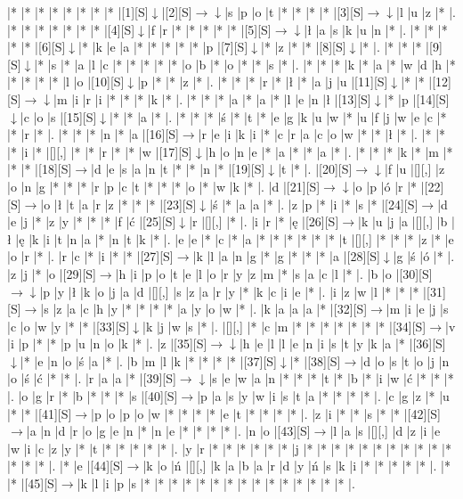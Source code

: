 \documentclass[11pt]{article}
\newcommand\drarr{$\rightarrow \!\!\!\!\! \downarrow$}
\newcommand\rarr{$\rightarrow$}
\newcommand\darr{$\downarrow$}
\begin{document}
\noindent\begin{Puzzle}{22}{31}|*	|*	|*	|*	|*	|*	|*	|*	|[1][S]\darr	|[2][S]\drarr	|s	|p	|o	|t	|*	|*	|*	|*	|[3][S]\drarr	|l	|u	|z	|*	|.
|*	|*	|*	|*	|*	|*	|*	|[4][S]\darr	|f	|r	|*	|*	|*	|*	|*	|[5][S]\drarr	|ł	|a	|s	|k	|u	|n	|*	|.
|*	|*	|*	|*	|*	|[6][S]\darr	|*	|k	|e	|a	|*	|*	|*	|*	|*	|p	|[7][S]\darr	|*	|z	|*	|*	|[8][S]\darr	|*	|.
|*	|*	|*	|[9][S]\darr	|*	|s	|*	|a	|l	|c	|*	|*	|*	|*	|*	|o	|b	|*	|o	|*	|*	|s	|*	|.
|*	|*	|*	|k	|*	|a	|*	|w	|d	|h	|*	|*	|*	|*	|*	|l	|o	|[10][S]\darr	|p	|*	|*	|z	|*	|.
|*	|*	|*	|r	|*	|ł	|*	|a	|j	|u	|[11][S]\darr	|*	|*	|[12][S]\drarr	|m	|i	|r	|i	|*	|*	|*	|k	|*	|.
|*	|*	|*	|a	|*	|a	|*	|l	|e	|n	|ł	|[13][S]\darr	|*	|p	|[14][S]\darr	|c	|o	|s	|[15][S]\darr	|*	|*	|a	|*	|.
|*	|*	|*	|ś	|*	|t	|*	|e	|g	|k	|u	|w	|*	|u	|f	|j	|w	|e	|c	|*	|*	|r	|*	|.
|*	|*	|*	|n	|*	|a	|[16][S]\rarr	|r	|e	|i	|k	|i	|*	|c	|r	|a	|c	|o	|w	|*	|*	|ł	|*	|.
|*	|*	|*	|i	|*	|[][,]{ }	|*	|*	|r	|*	|*	|w	|[17][S]\darr	|h	|o	|n	|e	|*	|a	|*	|*	|a	|*	|.
|*	|*	|*	|k	|*	|m	|*	|*	|*	|[18][S]\rarr	|d	|e	|s	|a	|n	|t	|*	|*	|n	|*	|[19][S]\darr	|t	|*	|.
|[20][S]\drarr	|f	|u	|[][,]{ }	|z	|o	|n	|g	|*	|*	|*	|r	|p	|c	|t	|*	|*	|*	|o	|*	|w	|k	|*	|.
|d	|[21][S]\drarr	|o	|p	|ó	|r	|*	|[22][S]\rarr	|o	|ł	|t	|a	|r	|z	|*	|*	|*	|[23][S]\darr	|ś	|*	|a	|a	|*	|.
|z	|p	|*	|i	|*	|s	|*	|[24][S]\rarr	|d	|e	|j	|*	|z	|y	|*	|*	|*	|f	|ć	|[25][S]\darr	|r	|[][,]{ }	|*	|.
|i	|r	|*	|ę	|[26][S]\rarr	|k	|u	|j	|a	|[][,]{ }	|b	|ł	|ę	|k	|i	|t	|n	|a	|*	|n	|t	|k	|*	|.
|e	|e	|*	|c	|*	|a	|*	|*	|*	|*	|*	|*	|t	|[][,]{ }	|*	|*	|*	|z	|*	|e	|o	|r	|*	|.
|r	|c	|*	|i	|*	|*	|[27][S]\rarr	|k	|l	|a	|n	|g	|*	|g	|*	|*	|*	|a	|[28][S]\darr	|g	|ś	|ó	|*	|.
|z	|j	|*	|o	|[29][S]\rarr	|h	|i	|p	|o	|t	|e	|l	|o	|r	|y	|z	|m	|*	|s	|a	|c	|l	|*	|.
|b	|o	|[30][S]\drarr	|p	|y	|ł	|k	|o	|j	|a	|d	|[][,]{ }	|s	|z	|a	|r	|y	|*	|k	|c	|i	|e	|*	|.
|i	|z	|w	|l	|*	|*	|*	|[31][S]\rarr	|s	|z	|a	|c	|h	|y	|*	|*	|*	|*	|a	|y	|o	|w	|*	|.
|k	|a	|a	|a	|*	|[32][S]\rarr	|m	|i	|e	|j	|s	|c	|o	|w	|y	|*	|*	|[33][S]\darr	|k	|j	|w	|s	|*	|.
|[][,]{ }	|*	|c	|m	|*	|*	|*	|*	|*	|*	|*	|[34][S]\rarr	|v	|i	|p	|*	|*	|p	|u	|n	|o	|k	|*	|.
|z	|[35][S]\drarr	|h	|e	|l	|l	|e	|n	|i	|s	|t	|y	|k	|a	|*	|[36][S]\darr	|*	|e	|n	|o	|ś	|a	|*	|.
|b	|m	|l	|k	|*	|*	|*	|*	|[37][S]\darr	|*	|[38][S]\rarr	|d	|o	|s	|t	|o	|j	|n	|o	|ś	|ć	|*	|*	|.
|r	|a	|a	|*	|[39][S]\drarr	|s	|e	|w	|a	|n	|*	|*	|*	|t	|*	|b	|*	|i	|w	|ć	|*	|*	|*	|.
|o	|g	|r	|*	|b	|*	|*	|*	|s	|[40][S]\rarr	|p	|a	|s	|y	|w	|i	|s	|t	|a	|*	|*	|*	|*	|.
|c	|g	|z	|*	|u	|*	|*	|[41][S]\rarr	|p	|o	|p	|o	|w	|*	|*	|*	|*	|e	|t	|*	|*	|*	|*	|.
|z	|i	|*	|*	|s	|*	|*	|[42][S]\rarr	|a	|n	|d	|r	|o	|g	|e	|n	|*	|n	|e	|*	|*	|*	|*	|.
|n	|o	|[43][S]\rarr	|l	|a	|s	|[][,]{ }	|d	|z	|i	|e	|w	|i	|c	|z	|y	|*	|t	|*	|*	|*	|*	|*	|.
|y	|r	|*	|*	|*	|*	|*	|*	|j	|*	|*	|*	|*	|*	|*	|*	|*	|*	|*	|*	|*	|*	|*	|.
|*	|e	|[44][S]\rarr	|k	|o	|ń	|[][,]{ }	|k	|a	|b	|a	|r	|d	|y	|ń	|s	|k	|i	|*	|*	|*	|*	|*	|.
|*	|*	|[45][S]\rarr	|k	|l	|i	|p	|s	|*	|*	|*	|*	|*	|*	|*	|*	|*	|*	|*	|*	|*	|*	|*	|.\end{Puzzle}
\end{document}
